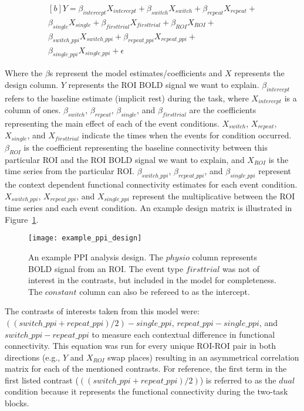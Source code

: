 \documentclass[phd,appendix,figures]{uithesis}
\begin{document}
\begin{equation}
	\begin{multlined}[b]
    Y = \beta_{intercept}X_{intercept} + \beta_{switch}X_{switch} + \beta_{repeat}X_{repeat} + \\
	      \beta_{single}X_{single} + \beta_{firsttrial}X_{firsttrial} + \beta_{ROI}X_{ROI} + \\
		\beta_{switch\_ppi}X_{switch\_ppi} + \beta_{repeat\_ppi}X_{repeat\_ppi} + \\
		\beta_{single\_ppi} X_{single\_ppi} + \epsilon
  \end{multlined}
  \label{eq:full_ppi}
\end{equation}

Where the $\beta$s represent the model estimates/coefficients and $X$ represents
the design column.
$Y$ represents the ROI BOLD signal we want to explain.
$\beta_{intercept}$ refers to the baseline estimate (implicit rest) during the task,
where $X_{intercept}$ is a column of ones.
$\beta_{switch}$, $\beta_{repeat}$, $\beta_{single}$, and $\beta_{firsttrial}$
are the coefficients representing the main effect of each of the event conditions.
$X_{switch}$, $X_{repeat}$, $X_{single}$, and $X_{firsttrial}$ indicate the
times when the events for condition occurred.
$\beta_{ROI}$ is the coefficient representing the baseline connectivity between
this particular ROI and the ROI BOLD signal we want to explain, and
$X_{ROI}$ is the time series from the particular ROI.
$\beta_{switch\_ppi}$, $\beta_{repeat\_ppi}$, and $\beta_{single\_ppi}$
represent the context dependent functional connectivity estimates for
each event condition.
$X_{switch\_ppi}$, $X_{repeat\_ppi}$, and $X_{single\_ppi}$ represent
the multiplicative between the ROI time series and each event condition.
An example design matrix is illustrated in Figure~\ref{fig:example_ppi_design}.

\begin{figure}[H]
  \centering
  \texttt{[image: example\_ppi\_design]}
  \caption[An example PPI analysis design]{
    An example PPI analysis design.
    The $physio$ column represents BOLD signal from an ROI.
    The event type $firsttrial$ was not of interest in the contrasts,
    but included in the model for completeness.
    The $constant$ column can also be refereed to as the intercept.
  }
  \label{fig:example_ppi_design}
\end{figure}

The contrasts of interests taken from this model were:\\
$((switch\_ppi + repeat\_ppi) / 2) - single\_ppi$, $repeat\_ppi - single\_ppi$,
and $switch\_ppi - repeat\_ppi$ to measure each contextual difference in functional connectivity. 
This equation was run for every unique ROI-ROI pair in both directions
(e.g., $Y$ and $X_{ROI}$ swap places) resulting in an
asymmetrical correlation matrix for each of the mentioned contrasts.
For reference, the first term in the first listed contrast ($((switch\_ppi + repeat\_ppi) / 2)$)
is referred to as the $dual$ condition because it represents the functional connectivity during the
two-task blocks.
\end{document}

